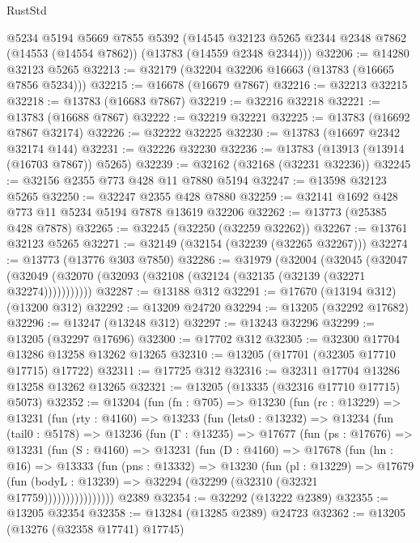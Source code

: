 \begin{lexlean}{RustStd}
\begin{coremodule}
    @5234
    @5194
    @5669
    @7855
    @5392
    (@14545 @32123 @5265 @2344 @2348 @7862 (@14553 (@14554 @7862)) (@13783 (@14559 @2348 @2344)))
@32206 := @14280 @32123 @5265
@32213 := @32179 (@32204 @32206 @16663 (@13783 (@16665 @7856 @5234)))
@32215 := @16678 (@16679 @7867)
@32216 := @32213 @32215
@32218 := @13783 (@16683 @7867)
@32219 := @32216 @32218
@32221 := @13783 (@16688 @7867)
@32222 := @32219 @32221
@32225 := @13783 (@16692 @7867 @32174)
@32226 := @32222 @32225
@32230 := @13783 (@16697 @2342 @32174 @144)
@32231 := @32226 @32230
@32236 := @13783 (@13913 (@13914 (@16703 @7867)) @5265)
@32239 := @32162 (@32168 (@32231 @32236))
@32245 := @32156 @2355 @773 @428 @11 @7880 @5194
@32247 := @13598 @32123 @5265
@32250 := @32247 @2355 @428 @7880
@32259 := @32141 @1692 @428 @773 @11 @5234 @5194 @7878 @13619 @32206
@32262 := @13773 (@25385 @428 @7878)
@32265 := @32245 (@32250 (@32259 @32262))
@32267 := @13761 @32123 @5265
@32271 := @32149 (@32154 (@32239 (@32265 @32267)))
@32274 := @13773 (@13776 @303 @7850)
@32286 := @31979
    (@32004
      (@32045
        (@32047 (@32049 (@32070 (@32093 (@32108 (@32124 (@32135 (@32139 (@32271 @32274)))))))))))
@32287 := @13188 @312
@32291 := @17670 (@13194 @312) (@13200 @312)
@32292 := @13209 @24720
@32294 := @13205 (@32292 @17682)
@32296 := @13247 (@13248 @312)
@32297 := @13243 @32296
@32299 := @13205 (@32297 @17696)
@32300 := @17702 @312
@32305 := @32300 @17704 @13286 @13258 @13262 @13265
@32310 := @13205 (@17701 (@32305 @17710 @17715) @17722)
@32311 := @17725 @312
@32316 := @32311 @17704 @13286 @13258 @13262 @13265
@32321 := @13205 (@13335 (@32316 @17710 @17715) @5073)
@32352 := @13204
    (fun (fn : @705) =>
    @13230
      (fun (rc : @13229) =>
      @13231
        (fun (rty : @4160) =>
        @13233
          (fun (lets0 : @13232) =>
          @13234
            (fun (tail0 : @5178) =>
            @13236
              (fun (Γ : @13235) =>
              @17677
                (fun (ps : @17676) =>
                @13231
                  (fun (S : @4160) =>
                  @13231
                    (fun (D : @4160) =>
                    @17678
                      (fun (hn : @16) =>
                      @13333
                        (fun (pns : @13332) =>
                        @13230
                          (fun (pl : @13229) =>
                          @17679
                            (fun (bodyL : @13239) =>
                            @32294 (@32299 (@32310 (@32321 @17759))))))))))))))))
    @2389
@32354 := @32292 (@13222 @2389)
@32355 := @13205 @32354
@32358 := @13284 (@13285 @2389) @24723
@32362 := @13205 (@13276 (@32358 @17741) @17745)

\end{coremodule}
\end{lexlean}
